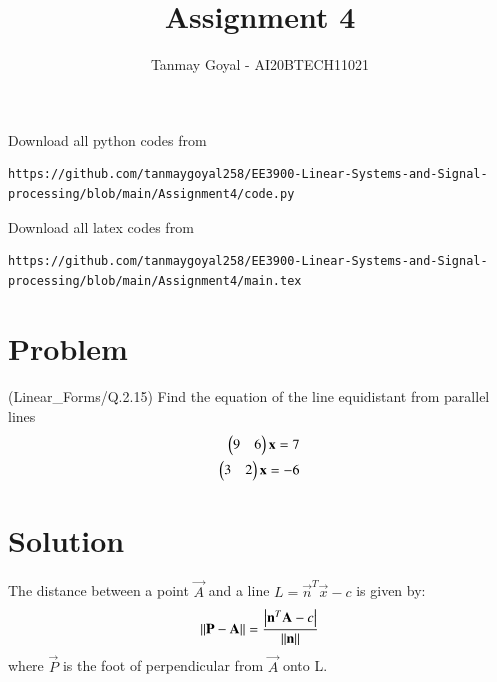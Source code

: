 \documentclass[journal,12pt,twocolumn]{IEEEtran}
\begin{document}
\def\putbox#1#2#3{\makebox[0in][l]{\makebox[#1][l]{}\raisebox{\baselineskip}[0in][0in]{\raisebox{#2}[0in][0in]{#3}}}}
     \def\rightbox#1{\makebox[0in][r]{#1}}
     \def\centbox#1{\makebox[0in]{#1}}
     \def\topbox#1{\raisebox{-\baselineskip}[0in][0in]{#1}}
     \def\midbox#1{\raisebox{-0.5\baselineskip}[0in][0in]{#1}}
\vspace{3cm}
\title{Assignment 4}
\author{Tanmay Goyal - AI20BTECH11021}
\maketitle
\newpage
\bigskip
\renewcommand{\thefigure}{\theenumi}
\renewcommand{\thetable}{\theenumi}
Download all python codes from 
\begin{lstlisting}
https://github.com/tanmaygoyal258/EE3900-Linear-Systems-and-Signal-processing/blob/main/Assignment4/code.py
\end{lstlisting}
Download all latex codes from 
\begin{lstlisting}
https://github.com/tanmaygoyal258/EE3900-Linear-Systems-and-Signal-processing/blob/main/Assignment4/main.tex
\end{lstlisting}
\section{Problem}
(Linear\_Forms/Q.2.15) Find the equation of the line equidistant from parallel lines
\begin{align}
    \begin{pmatrix}9 & 6\end{pmatrix}\mathbf{x} = 7\\
    \begin{pmatrix}3 & 2\end{pmatrix}\mathbf{x} = -6
\end{align}
\section{Solution}
The distance between a point $\vec{A}$ and a line $L = \vec{n}^T\vec{x} - c$ is given by:
\begin{align}
    \left\lVert\mathbf{P} - \mathbf{A}\right\rVert = \frac{\left\vert\mathbf{n}^T \mathbf{A} - c\right\vert}{\left\lVert\mathbf{n}\right\rVert}
\end{align}
where $\vec{P}$ is the foot of perpendicular from $\vec{A}$ onto L.\\
\end{document}
